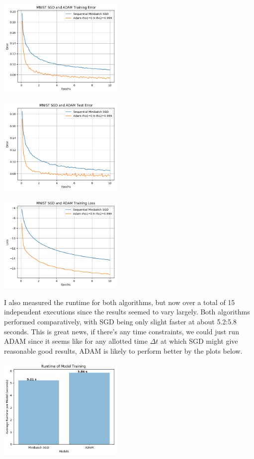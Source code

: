 \documentclass[10pt]{article}
\begin{document}
\begin{multicols}{2}
\begin{center}
    \includegraphics[width=0.45\textwidth]{SGDandADAMTrainingError.png}
\end{center}
\begin{center}
    \includegraphics[width=0.45\textwidth]{SGDandADAMTestError.png}
\end{center}
\begin{center}
    \includegraphics[width=0.45\textwidth]{SGDandADAMTrainingLoss.png}
\end{center} 
I also measured the runtime for both algorithms, but now over a total of 15 independent executions since the results seemed to vary largely. Both algorithms performed comparatively, with SGD being only slight faster at about 5.2:5.8 seconds. This is great news, if there's any time constraints, we could just run ADAM since it seems like for any allotted time $\Delta t$ at which SGD might give reasonable good results, ADAM is likely to perform better by the plots below.\par
\begin{center}
    \includegraphics[width=0.45\textwidth]{train_time_part3.png}

\end{center}
\end{multicols}
\end{document}
